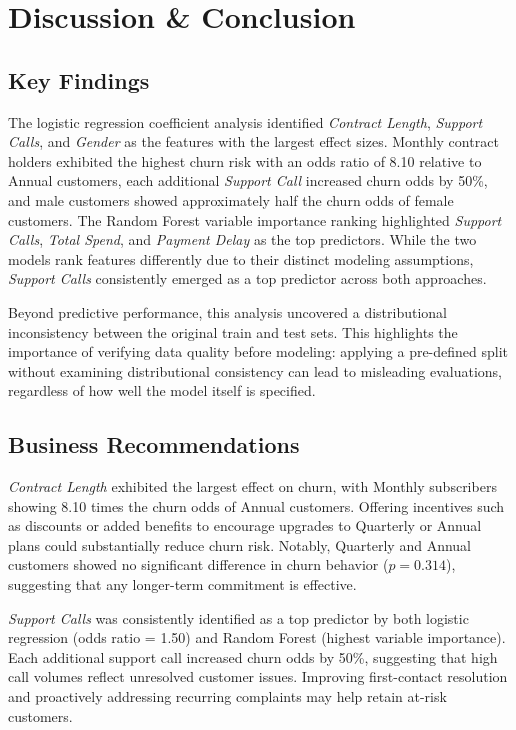 \documentclass[12pt]{article}
\begin{document}
\section{Discussion \& Conclusion}

\subsection{Key Findings}

The logistic regression coefficient analysis identified \textit{Contract Length}, 
\textit{Support Calls}, and \textit{Gender} as the features with the largest 
effect sizes. Monthly contract holders exhibited the highest churn risk with an 
odds ratio of 8.10 relative to Annual customers, each additional 
\textit{Support Call} increased churn odds by 50\%, and male customers showed 
approximately half the churn odds of female customers. The Random Forest variable 
importance ranking highlighted \textit{Support Calls}, \textit{Total Spend}, and 
\textit{Payment Delay} as the top predictors. While the two models rank features 
differently due to their distinct modeling assumptions, \textit{Support Calls} 
consistently emerged as a top predictor across both approaches.

Beyond predictive performance, this analysis uncovered a distributional 
inconsistency between the original train and test sets. This highlights the 
importance of verifying data quality before modeling: applying a pre-defined 
split without examining distributional consistency can lead to misleading 
evaluations, regardless of how well the model itself is specified.

\subsection{Business Recommendations}

\textit{Contract Length} exhibited the largest effect on churn, with Monthly 
subscribers showing 8.10 times the churn odds of Annual customers. Offering 
incentives such as discounts or added benefits to encourage upgrades to 
Quarterly or Annual plans could substantially reduce churn risk. Notably, 
Quarterly and Annual customers showed no significant difference in churn 
behavior ($p = 0.314$), suggesting that any longer-term commitment is 
effective.

\textit{Support Calls} was consistently identified as a top predictor by both 
logistic regression (odds ratio = 1.50) and Random Forest (highest variable 
importance). Each additional support call increased churn odds by 50\%, 
suggesting that high call volumes reflect unresolved customer issues. Improving 
first-contact resolution and proactively addressing recurring complaints may 
help retain at-risk customers.
\end{document}
